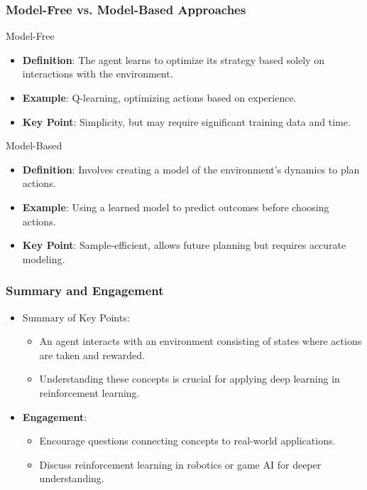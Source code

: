 \documentclass[aspectratio=169]{beamer}
\begin{document}
\begin{frame}[fragile]
    \frametitle{Model-Free vs. Model-Based Approaches}
    \begin{block}{Model-Free}
        \begin{itemize}
            \item \textbf{Definition}: The agent learns to optimize its strategy based solely on interactions with the environment.
            \item \textbf{Example}: Q-learning, optimizing actions based on experience.
            \item \textbf{Key Point}: Simplicity, but may require significant training data and time.
        \end{itemize}
    \end{block}
    
    \begin{block}{Model-Based}
        \begin{itemize}
            \item \textbf{Definition}: Involves creating a model of the environment’s dynamics to plan actions.
            \item \textbf{Example}: Using a learned model to predict outcomes before choosing actions.
            \item \textbf{Key Point}: Sample-efficient, allows future planning but requires accurate modeling.
        \end{itemize}
    \end{block}
\end{frame}

\begin{frame}[fragile]
    \frametitle{Summary and Engagement}
    \begin{itemize}
        \item Summary of Key Points:
        \begin{itemize}
            \item An agent interacts with an environment consisting of states where actions are taken and rewarded.
            \item Understanding these concepts is crucial for applying deep learning in reinforcement learning.
        \end{itemize}

        \item \textbf{Engagement}:
        \begin{itemize}
            \item Encourage questions connecting concepts to real-world applications.
            \item Discuss reinforcement learning in robotics or game AI for deeper understanding.
        \end{itemize}
    \end{itemize}
\end{frame}
\end{document}
